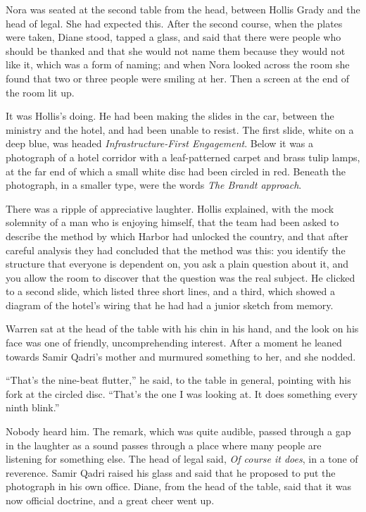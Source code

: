 Nora was seated at the second table from the head, between Hollis Grady and the head of legal. She had expected this. After the second course, when the plates were taken, Diane stood, tapped a glass, and said that there were people who should be thanked and that she would not name them because they would not like it, which was a form of naming; and when Nora looked across the room she found that two or three people were smiling at her. Then a screen at the end of the room lit up.

It was Hollis's doing. He had been making the slides in the car, between the ministry and the hotel, and had been unable to resist. The first slide, white on a deep blue, was headed \emph{Infrastructure-First Engagement}. Below it was a photograph of a hotel corridor with a leaf-patterned carpet and brass tulip lamps, at the far end of which a small white disc had been circled in red. Beneath the photograph, in a smaller type, were the words \emph{The Brandt approach}.

There was a ripple of appreciative laughter. Hollis explained, with the mock solemnity of a man who is enjoying himself, that the team had been asked to describe the method by which Harbor had unlocked the country, and that after careful analysis they had concluded that the method was this: you identify the structure that everyone is dependent on, you ask a plain question about it, and you allow the room to discover that the question was the real subject. He clicked to a second slide, which listed three short lines, and a third, which showed a diagram of the hotel's wiring that he had had a junior sketch from memory.

Warren sat at the head of the table with his chin in his hand, and the look on his face was one of friendly, uncomprehending interest. After a moment he leaned towards Samir Qadri's mother and murmured something to her, and she nodded.

``That's the nine-beat flutter,'' he said, to the table in general, pointing with his fork at the circled disc. ``That's the one I was looking at. It does something every ninth blink.''

Nobody heard him. The remark, which was quite audible, passed through a gap in the laughter as a sound passes through a place where many people are listening for something else. The head of legal said, \emph{Of course it does}, in a tone of reverence. Samir Qadri raised his glass and said that he proposed to put the photograph in his own office. Diane, from the head of the table, said that it was now official doctrine, and a great cheer went up.

